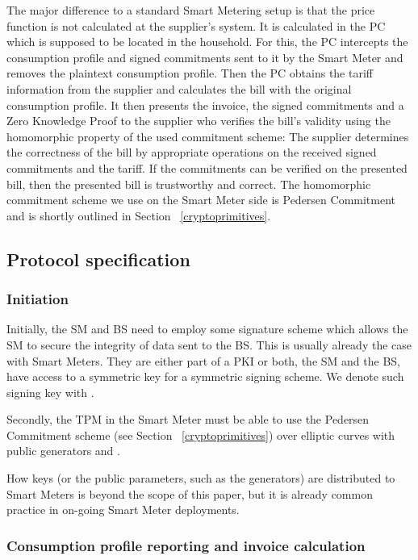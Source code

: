\documentclass[english]{llncs}
\begin{document}
The major difference to a standard Smart Metering setup is that the price function  is not calculated at the supplier's system.
It is calculated in the PC which is supposed to be located in the household. 
For this, the PC intercepts the consumption profile and signed commitments sent to it by the Smart Meter 
and removes the plaintext consumption profile.
Then the PC obtains the tariff information from the supplier and calculates the bill with the original consumption profile.
It then presents the invoice, the signed commitments and a Zero Knowledge Proof to the supplier who verifies the bill's validity using the homomorphic property of the used commitment scheme:
The supplier determines the correctness of the bill by appropriate operations on the received signed commitments and the tariff.
If the commitments can be verified on the presented bill, then the presented bill is trustworthy and correct.
The homomorphic commitment scheme we use on the Smart Meter side is Pedersen Commitment~\cite{Ped} and is shortly outlined in Section ~\ref{cryptoprimitives}.

\subsection{Protocol specification}
\label{concretesolution}

\subsubsection{Initiation}
\label{initiation}
Initially, the SM and BS need to employ some signature scheme which allows the SM to secure the integrity of data sent to the BS. This is usually already the case with Smart Meters. They are either part of a PKI or both, the SM and the BS, have access to a symmetric key for a symmetric signing scheme. We denote such signing key with .

Secondly, the TPM in the Smart Meter must be able to use the Pedersen Commitment scheme (see Section ~\ref{cryptoprimitives}) over elliptic curves with public generators  and .

How keys (or the public parameters, such as the generators) are distributed to Smart Meters is beyond the scope of this paper, but it is already common practice in on-going Smart Meter deployments.

\subsubsection{Consumption profile reporting and invoice calculation}
\label{calculation}
\end{document}

